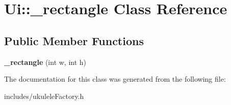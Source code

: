 \hypertarget{class_ui_1_1__rectangle}{}\section{Ui\+:\+:\+\_\+rectangle Class Reference}
\label{class_ui_1_1__rectangle}
\subsection*{Public Member Functions}
\begin{DoxyCompactItemize}
\item 
\hypertarget{class_ui_1_1__rectangle_a9e1daa6dc4407aacc9476cdc8c67cd81}{}\label{class_ui_1_1__rectangle_a9e1daa6dc4407aacc9476cdc8c67cd81} 
{\bfseries \+\_\+rectangle} (int w, int h)
\end{DoxyCompactItemize}


The documentation for this class was generated from the following file\+:\begin{DoxyCompactItemize}
\item 
includes/ukulele\+Factory.\+h\end{DoxyCompactItemize}
